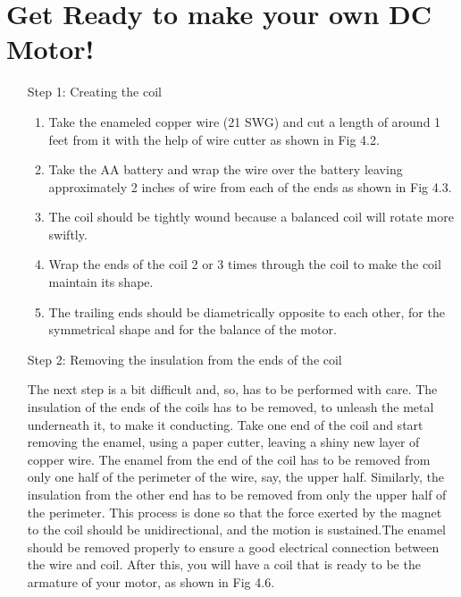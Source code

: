 \section{Get Ready to make your own DC Motor!}
\begin{enumerate}
    \item[Step 1:] Creating the coil
        \begin{enumerate}
            \item Take the enameled copper wire (21 SWG) and cut a length of
                around 1 feet from it with the help of wire cutter as shown in Fig
                4.2.
            \item Take the AA battery and wrap the wire over the battery leaving approximately 2 inches of wire from each of the ends as shown
            in Fig 4.3.
            \item The coil should be tightly wound because a balanced coil will
            rotate more swiftly.
            \item Wrap the ends of the coil 2 or 3 times through the coil to make
            the coil maintain its shape.
            \item The trailing ends should be diametrically opposite to each other,
            for the symmetrical shape and for the balance of the motor.
        \end{enumerate} 
    \item[Step 2:] Removing the insulation from the ends of the coil 
        \item[] 
            The next step is a bit difficult and, so, has to be performed with care. The
            insulation of the ends of the coils has to be removed, to unleash the
            metal underneath it, to make it conducting. Take one end of the coil
            and start removing the enamel, using a paper cutter, leaving a shiny
            new layer of copper wire. The enamel from the end of the coil has to be
            removed from only one half of the perimeter of the wire, say, the upper
            half. Similarly, the insulation from the other end has to be removed
            from only the upper half of the perimeter. This process is done so that
            the force exerted by the magnet to the coil should be unidirectional,
            and the motion is sustained.The enamel should be removed properly to
            ensure a good electrical connection between the wire and coil. After
            this, you will have a coil that is ready to be the armature of your motor,
            as shown in Fig 4.6.

\end{enumerate}
